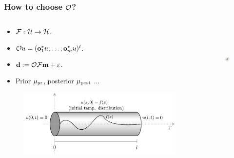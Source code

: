 \documentclass{beamer}
\begin{document}
\begin{frame}
  \frametitle{How to choose $\mathcal{O}$?}
  \begin{columns}
    \begin{column}{0.5\textwidth}
      
      \begin{itemize}
      \item \(\mathcal{F}: \mathcal{H} \to \mathcal{H}\).
      \item \(\mathcal{O} u = (\mathbf{o}_1^*u, \dots, \mathbf{o}_m^*u )^t\).
      \item \(\mathbf{d} := \mathcal{O} \mathcal{F} \mathbf{m} + \varepsilon\).
      \item Prior $\mu_{\textup{pr}}$, posterior $\mu_{\textup{post}}$ ...
      \end{itemize}
  
      \begin{figure}
        \centering
        \includegraphics[width=1.2\textwidth, height=0.66\textwidth]{heat_rod.png}
      \end{figure}
    \end{column}

    \begin{column}{0.5\textwidth}

      \begin{figure}
        \centering
        \includegraphics[width=\linewidth, height=3.5cm]{CT.png}
      \end{figure}


\end{column}
\end{columns}
\end{frame}
\end{document}
